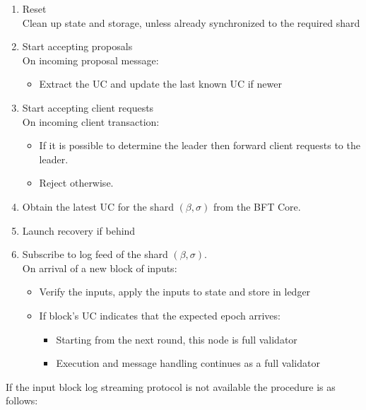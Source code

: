 \begin{shaded}
  \begin{enumerate}[nosep]
    \item Reset \\
          Clean up state and storage, unless already synchronized to the required shard
    \item Start accepting proposals \\
          On incoming proposal message:
          \begin{itemize}[nosep]
            \item Extract the UC and update the last known UC if newer
          \end{itemize}
    \item Start accepting client requests \\
          On incoming client transaction:
          \begin{itemize}[nosep]
            \item If it is possible to determine the leader then forward client requests to the leader.
            \item Reject otherwise.
          \end{itemize}
    \item Obtain the latest UC for the shard $(\beta, \sigma)$ from the BFT Core.
    \item Launch recovery if behind
    \item Subscribe to log feed of the shard $(\beta, \sigma)$.\\
          On arrival of a new block of inputs:
          \begin{itemize}[nosep]
            \item Verify the inputs, apply the inputs to state and store in ledger
            \item If block's UC indicates that the expected epoch arrives:
            \begin{itemize}[nosep]
                \item Starting from the next round, this node is full validator
                \item Execution and message handling continues as a full validator
            \end{itemize}
          \end{itemize}
  \end{enumerate}
\end{shaded}

If the input block log streaming protocol is not available the procedure is as follows:

